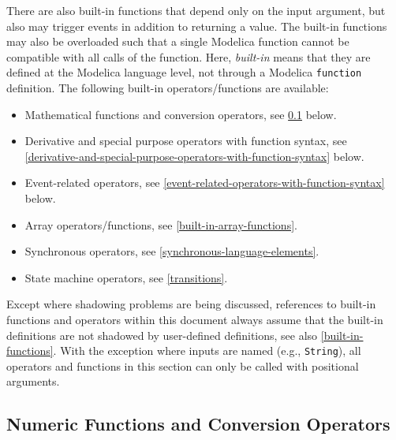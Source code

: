 There are also built-in functions that depend only on the input argument, but also may trigger events in addition to returning a value.
The built-in functions may also be overloaded such that a single Modelica function cannot be compatible with all calls of the function.
Here, \emph{built-in} means that they are defined at the Modelica language level, not through a Modelica \lstinline!function! definition.
The following built-in operators/functions are available:
\begin{itemize}
\item
  Mathematical functions and conversion operators, see \cref{numeric-functions-and-conversion-functions} below.
\item
  Derivative and special purpose operators with function syntax, see \cref{derivative-and-special-purpose-operators-with-function-syntax} below.
\item
  Event-related operators, see \cref{event-related-operators-with-function-syntax} below.
\item
  Array operators/functions, see \cref{built-in-array-functions}.
\item
  Synchronous operators, see \cref{synchronous-language-elements}.
\item
  State machine operators, see \cref{transitions}.
\end{itemize}

Except where shadowing problems are being discussed, references to built-in functions and operators within this document always assume that the built-in definitions are not shadowed by user-defined definitions, see also \cref{built-in-functions}.
With the exception where inputs are named (e.g., \lstinline!String!), all operators and functions in this section can only be called with positional arguments.

\subsection{Numeric Functions and Conversion Operators}\label{numeric-functions-and-conversion-functions}

